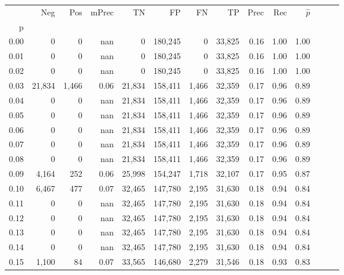 \begin{tabular}{rrrrrrrrrrrrrr}
\toprule
{} &     Neg &    Pos & mPrec &       TN &       FP &      FN &      TP &  Prec &   Rec & $\hat{p}$ \\
p    &         &        &       &          &          &         &         &       &       &           \\
\midrule
0.00 &       0 &      0 &   nan &        0 &  180,245 &       0 &  33,825 &  0.16 &  1.00 &      1.00 \\
0.01 &       0 &      0 &   nan &        0 &  180,245 &       0 &  33,825 &  0.16 &  1.00 &      1.00 \\
0.02 &       0 &      0 &   nan &        0 &  180,245 &       0 &  33,825 &  0.16 &  1.00 &      1.00 \\
0.03 &  21,834 &  1,466 &  0.06 &   21,834 &  158,411 &   1,466 &  32,359 &  0.17 &  0.96 &      0.89 \\
0.04 &       0 &      0 &   nan &   21,834 &  158,411 &   1,466 &  32,359 &  0.17 &  0.96 &      0.89 \\
0.05 &       0 &      0 &   nan &   21,834 &  158,411 &   1,466 &  32,359 &  0.17 &  0.96 &      0.89 \\
0.06 &       0 &      0 &   nan &   21,834 &  158,411 &   1,466 &  32,359 &  0.17 &  0.96 &      0.89 \\
0.07 &       0 &      0 &   nan &   21,834 &  158,411 &   1,466 &  32,359 &  0.17 &  0.96 &      0.89 \\
0.08 &       0 &      0 &   nan &   21,834 &  158,411 &   1,466 &  32,359 &  0.17 &  0.96 &      0.89 \\
0.09 &   4,164 &    252 &  0.06 &   25,998 &  154,247 &   1,718 &  32,107 &  0.17 &  0.95 &      0.87 \\
0.10 &   6,467 &    477 &  0.07 &   32,465 &  147,780 &   2,195 &  31,630 &  0.18 &  0.94 &      0.84 \\
0.11 &       0 &      0 &   nan &   32,465 &  147,780 &   2,195 &  31,630 &  0.18 &  0.94 &      0.84 \\
0.12 &       0 &      0 &   nan &   32,465 &  147,780 &   2,195 &  31,630 &  0.18 &  0.94 &      0.84 \\
0.13 &       0 &      0 &   nan &   32,465 &  147,780 &   2,195 &  31,630 &  0.18 &  0.94 &      0.84 \\
0.14 &       0 &      0 &   nan &   32,465 &  147,780 &   2,195 &  31,630 &  0.18 &  0.94 &      0.84 \\
0.15 &   1,100 &     84 &  0.07 &   33,565 &  146,680 &   2,279 &  31,546 &  0.18 &  0.93 &      0.83 \\

\end{tabular}
